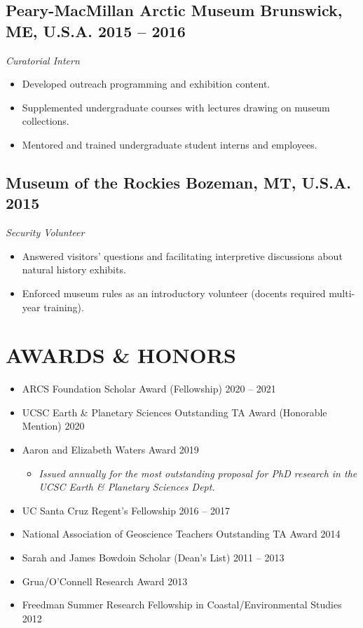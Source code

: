 \documentclass[10pt]{article}
\begin{document}
\subsection*{\textbf{Peary-MacMillan Arctic Museum} \hspace{15pt} Brunswick, ME, U.S.A. \hfill 2015 – 2016}
\textit{Curatorial Intern}
\begin{itemize}
	\item Developed outreach programming and exhibition content.
	\item Supplemented undergraduate courses with lectures drawing on museum collections.
	\item Mentored and trained undergraduate student interns and employees.
\end{itemize}

\subsection*{\textbf{Museum of the Rockies} \hspace{15pt} Bozeman, MT, U.S.A. \hfill 2015}
\textit{Security Volunteer}
\begin{itemize}
	\item Answered visitors' questions and facilitating interpretive discussions about natural history exhibits.
	\item Enforced museum rules as an introductory volunteer (docents required multi-year training).
\end{itemize}


\section*{AWARDS \& HONORS}

\begin{itemize} [leftmargin=0pt,label={},itemsep=1ex]
	\item ARCS Foundation Scholar Award (Fellowship) \hfill 2020 – 2021
	\item UCSC Earth \& Planetary Sciences Outstanding TA Award (Honorable Mention) \hfill 2020
	\item Aaron and Elizabeth Waters Award  \hfill 2019
	\begin{itemize} [label={}, rightmargin=30ex]
	\item \textit{Issued annually for the most outstanding proposal for PhD research in the UCSC Earth \& Planetary Sciences Dept.}
	\end{itemize}
	\item UC Santa Cruz Regent’s Fellowship \hfill 2016 – 2017
	\item National Association of Geoscience Teachers Outstanding TA Award \hfill 2014
	\item Sarah and James Bowdoin Scholar (Dean’s List) \hfill 2011 – 2013
	\item Grua/O’Connell Research Award  \hfill 2013
	\item Freedman Summer Research Fellowship in Coastal/Environmental Studies \hfill 2012
\end{itemize}
\end{document}
